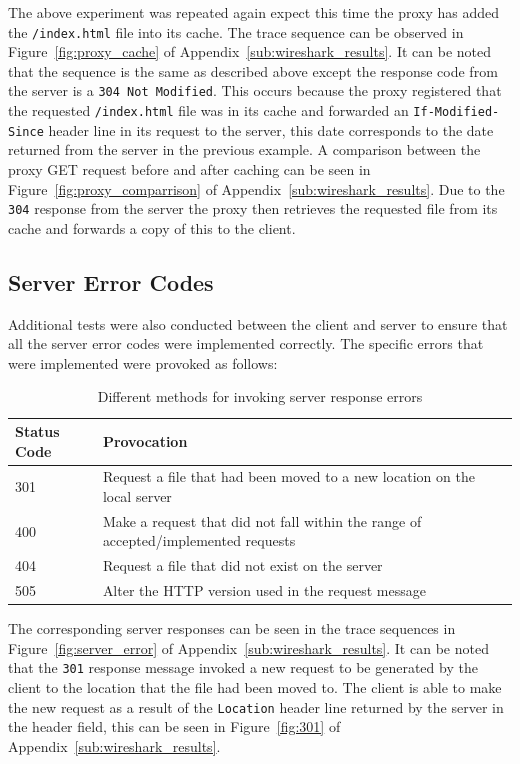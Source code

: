 \documentclass[10pt,twocolumn]{witseiepaper}
\begin{document}
		 The above experiment was repeated again expect this time the proxy has added the \texttt{/index.html} file into its cache. The trace sequence can be observed in Figure~\ref{fig:proxy_cache} of Appendix~\ref{sub:wireshark_results}. It can be noted that the sequence is the same as described above except the response code from the server is a \texttt{304 Not Modified}. This occurs because the proxy registered that the requested \texttt{/index.html} file was in its cache and forwarded an \texttt{If-Modified-Since} header line in its request to the server, this date corresponds to the date returned from the server in the previous example. A comparison between the proxy GET request before and after caching can be seen in Figure~\ref{fig:proxy_comparrison} of Appendix~\ref{sub:wireshark_results}. Due to the \texttt{304} response from the server the proxy then retrieves the requested file from its cache and forwards a copy of this to the client.
	
	\subsection{Server Error Codes}
	
		Additional tests were also conducted between the client and server to ensure that all the server error codes were implemented correctly. The specific errors that were implemented were provoked as follows:
		
		\begin{table}[htbp]
			\centering
			\caption{Different methods for invoking server response errors}
			\label{tab:errors_responses}
			\begin{tabular}{p{}| p{}}
				\hline
				\textbf{Status Code} & \textbf{Provocation}\\ \hline
				301 & Request a file that had been moved to a new location on the local server \\
				400 & Make a request that did not fall within the range of accepted/implemented requests \\
				404 & Request a file that did not exist on the server \\
				505 & Alter the HTTP version used in the request message \\
				\hline
			\end{tabular}
		\end{table}
		
		The corresponding server responses can be seen in the trace sequences in Figure~\ref{fig:server_error} of Appendix~\ref{sub:wireshark_results}. It can be noted that the \texttt{301} response message invoked a new request to be generated by the client to the location that the file had been moved to. The client is able to make the new request as a result of the \texttt{Location} header line returned by the server in the header field, this can be seen in Figure~\ref{fig:301} of Appendix~\ref{sub:wireshark_results}.
	
\end{document}
